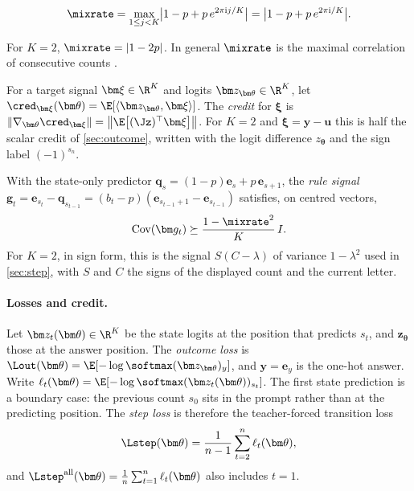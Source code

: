 \begin{definition}
\label{def:lambda}
\begin{equation}
 \mixrate=\max_{1\le j<K}\bigl|1-p+p\,e^{2\pi\mathrm ij/K}\bigr|=\bigl|1-p+p\,e^{2\pi\mathrm i/K}\bigr|.
 \label{eq:lambda}
\end{equation}
\end{definition}
For $K=2$, $\mixrate=|1-2p|$. In general $\mixrate$ is the maximal correlation of consecutive counts
\citep{witsenhausen1975sequences,raginsky2016strong}.

\begin{definition}[Credit]
\label{def:credit}
For a target signal $\bm\xi\in\R^K$ and logits $\bm z_{\bm\theta}\in\R^K$, let $\cred_{\bm\xi}(\bm\theta)=\E[\langle\bm z_{\bm\theta},\bm\xi\rangle]$.
The \emph{credit} for $\bm\xi$ is $\|\nabla_{\bm\theta}\cred_{\bm\xi}\|=\bigl\|\E\bigl[(\Jz)^\top\bm\xi\bigr]\bigr\|$.
For $K=2$ and $\bm\xi=\bm y-\bm u$ this is half the scalar credit of \cref{sec:outcome}, written with the logit
difference $z_{\bm\theta}$ and the sign label $(-1)^{s_n}$.
\end{definition}

With the state-only predictor $\bm q_s=(1-p)\bm e_s+p\,\bm e_{s+1}$, the \emph{rule signal}
$\bm g_t=\bm e_{s_t}-\bm q_{s_{t-1}}=(b_t-p)(\bm e_{s_{t-1}+1}-\bm e_{s_{t-1}})$ satisfies, on centred vectors,
\begin{equation}
 \operatorname{Cov}(\bm g_t)\succeq\frac{1-\mixrate^2}{K}\,I .
 \label{eq:local-variation}
\end{equation}
For $K=2$, in sign form, this is the signal $S(C-\lambda)$ of variance $1-\lambda^2$ used in \cref{sec:step}, with $S$ and $C$ the signs of the displayed count and the current letter.


\paragraph{Losses and credit.}

\begin{definition}
\label{def:losses}
Let $\bm z_t(\bm\theta)\in\R^K$ be the state logits at the position that predicts $s_t$, and $\bm z_{\bm\theta}$
those at the answer position. The \emph{outcome loss} is $\Lout(\bm\theta)=\E[-\log\softmax(\bm z_{\bm\theta})_y]$, and $\bm y=\bm e_y$ is the one-hot answer.
Write $\ell_t(\bm\theta)=\E[-\log\softmax(\bm z_t(\bm\theta))_{s_t}]$. The first state prediction is a boundary case: the previous
count $s_0$ sits in the prompt rather than at the predicting position. The \emph{step loss} is therefore the teacher-forced
transition loss
\[
 \Lstep(\bm\theta)=\frac{1}{n-1}\sum_{t=2}^n\ell_t(\bm\theta),
\]
and $\Lstep^{\mathrm{all}}(\bm\theta)=\tfrac{1}{n}\sum_{t=1}^n\ell_t(\bm\theta)$ also includes $t=1$.
\end{definition}

